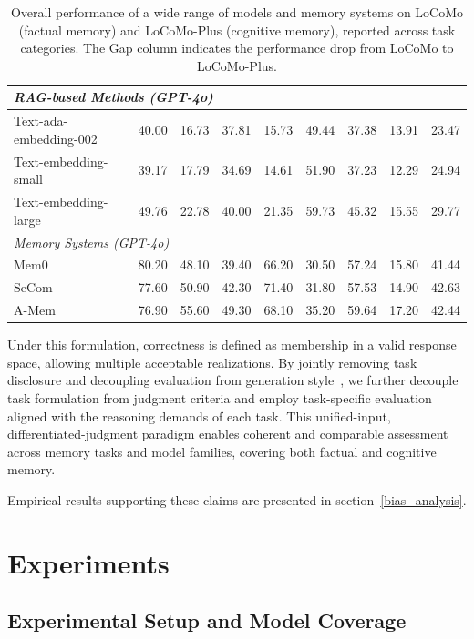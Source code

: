 \documentclass[11pt]{article}
\begin{document}
\begin{table}[t]
\begin{tabular}{lcccccccc}
\midrule
\multicolumn{9}{l}{\textit{RAG-based Methods (GPT-4o)}} \\
\midrule
Text-ada-embedding-002  & 40.00 & 16.73 & 37.81 & 15.73 & 49.44 & 37.38 & 13.91 & 23.47 \\
Text-embedding-small    & 39.17 & 17.79 & 34.69 & 14.61 & 51.90 & 37.23 & 12.29 & 24.94 \\
Text-embedding-large    & 49.76 & 22.78 & 40.00 & 21.35 & 59.73 & 45.32 & 15.55 & 29.77 \\


\midrule
\multicolumn{9}{l}{\textit{Memory Systems (GPT-4o)}} \\
\midrule
Mem0            
& 80.20 
& 48.10 
& 39.40 
& 66.20 
& 30.50 
& 57.24 
& 15.80 
& 41.44 \\
SeCom           
& 77.60 
& 50.90 
& 42.30 
& 71.40 
& 31.80 
& 57.53 
& 14.90 
& 42.63 \\
A-Mem           
& 76.90 
& 55.60 
& 49.30 
& 68.10 
& 35.20 
& 59.64 
& 17.20 
& 42.44 \\

\bottomrule
\end{tabular}
\caption{Overall performance of a wide range of models and memory
systems on LoCoMo (factual memory) and LoCoMo-Plus (cognitive memory),
reported across task categories. The Gap column indicates the
performance drop from LoCoMo to LoCoMo-Plus.}
\label{tab:overall}
\end{table}


Under this formulation, correctness is defined as membership in a valid
response space, allowing multiple acceptable realizations.
By jointly removing task disclosure and decoupling evaluation from
generation style~\cite{zheng2023judging,li2025generation},
we further decouple task formulation from judgment criteria and employ
task-specific evaluation aligned with the reasoning demands of each task.
This unified-input, differentiated-judgment paradigm enables coherent
and comparable assessment across memory tasks and model families,
covering both factual and cognitive memory.

Empirical results supporting these claims are presented in section~\ref{bias_analysis}.





\section{Experiments}

\subsection{Experimental Setup and Model Coverage}
\label{sec:exp_setup}
\end{document}
